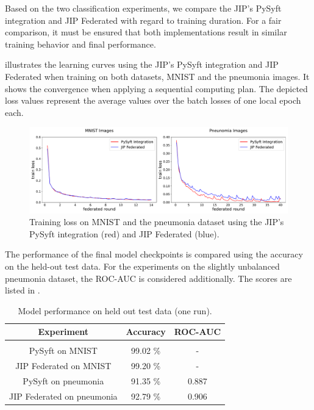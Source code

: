 Based on the two classification experiments, we compare the JIP's PySyft integration and JIP Federated with regard to training duration. For a fair comparison, it must be ensured that both implementations result in similar training behavior and final performance.

 illustrates the learning curves using the JIP's PySyft integration and JIP Federated when training on both datasets, MNIST and the pneumonia images. It shows the convergence when applying a sequential computing plan. The depicted loss values represent the average values over the batch losses of one local epoch each.

\begin{figure}[htbp]
    \centerline{\includegraphics[width=1.0\textwidth]{1_Figures/RuntimeExperiments_horizontal.pdf}}
    \caption{Training loss on MNIST and the pneumonia dataset using the JIP's PySyft integration (red) and JIP Federated (blue).}
\label{fig:RuntimeExp}
\end{figure}

The performance of the final model checkpoints is compared using the accuracy on the held-out test data. 
For the experiments on the slightly unbalanced pneumonia dataset, the ROC-AUC is considered additionally. The scores are listed in .

\begin{table}[htbp]
  \centering
  \begin{tabular}{ccc}
  Experiment & Accuracy & ROC-AUC \\
  \hline \\[-2.5ex] %
  PySyft on MNIST               & 99.02 \% & - \\
  JIP Federated on MNIST        & 99.20 \% & - \\
  PySyft on pneumonia           & 91.35 \% & 0.887 \\
  JIP Federated on pneumonia    & 92.79 \% & 0.906 \\
 \end{tabular}
 \caption{Model performance on held out test data (one run).}
 \label{tab:Performance}
\end{table}

